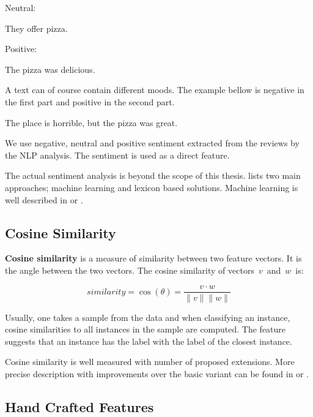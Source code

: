 Neutral:

\begin{code}
They offer pizza.
\end{code}

Positive:

\begin{code}
The pizza was delicious.
\end{code}

A text can of course contain different moods.
The example bellow is negative in the first part and positive in the second part.

\begin{code}
The place is horrible, but the pizza was great.
\end{code}

We use negative, neutral and positive sentiment extracted from the reviews by the NLP analysis.
The sentiment is used as a direct feature.

The actual sentiment analysis is beyond the scope of this thesis.
\citet{kaushik2014scalable} lists two main approaches; machine learning and lexicon based solutions.
Machine learning is well described in \citet{melville2009sentiment} or \citet{xia2011ensemble}.

\subsection{Cosine Similarity}

\textbf{Cosine similarity} is a measure of similarity between two feature vectors.
It is the angle between the two vectors.
The cosine similarity of vectors~$v$~and~$w$~is:

\[
	\mathit{similarity} = \cos\left(\theta\right) = \frac{v \cdot w}{\|v\| \| w \|}
\]

Usually, one takes a sample from the data and when classifying an instance,
cosine similarities to all instances in the sample are computed.
The feature suggests that an instance has the label with the label of the closest instance.

Cosine similarity is well measured with number of proposed extensions.
More precise description with improvements over the basic variant can be found
in \citet{li2013distance} or \citet{mikawa2011proposal}.


\subsection{Hand Crafted Features}

